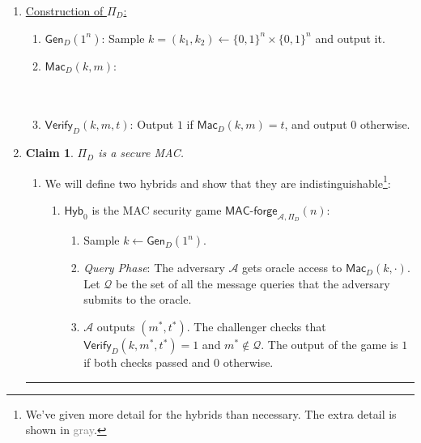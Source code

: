 \documentclass[11pt]{article}
\newcommand\custombox[2]{%
    \fbox{\rule{#1}{0pt}\rule[-0.5ex]{0pt}{#2}}}
\newcommand{\qed}{\hspace*{\fill}\rule{7pt}{7pt}}
\newtheorem{claim}[theorem]{Claim}
\numberwithin{equation}{section}
\newenvironment{proof}{\noindent{\bf Proof}\hspace*{1em}}{\qed\medskip}
\newcommand{\Gen}{\mathsf{Gen}}
\newcommand{\A}{\mathcal{A}}
\newcommand{\hyb}{\mathsf{Hyb}}
\newcommand{\bin}{\{0,1\}}
\newcommand{\bit}{\bin}
\newcommand{\gen}{\mathsf{Gen}}
\newcommand{\mac}{\mathsf{Mac}}
\newcommand{\verify}{\mathsf{Verify}}
\begin{document}
\begin{enumerate}
\item \noindent\underline{Construction of $\Pi_D$:}
\begin{enumerate}
    \item $\Gen_D(1^n)$: Sample $k = (k_1, k_2) \leftarrow \bit^n \times \bit^n$ and output it.
    \item $\mac_D(k,m)$:
    \\\\ 
    \custombox{5in}{.5in}\\
    \item $\verify_D(k,m,t)$: Output $1$ if $\mac_D(k,m) = t$, and output $0$ otherwise.
\end{enumerate}

\item 
\begin{claim}
    $\Pi_D$ is a secure MAC.
\end{claim}
\begin{proof}
\begin{enumerate}
    \item We will define two hybrids and show that they are indistinguishable\footnote{We've given more detail for the hybrids than necessary. The extra detail is shown in \textcolor{gray}{gray}.}:
    \begin{enumerate}
        \item $\hyb_0$ is the MAC security game $\mathsf{MAC\text{-}forge}_{\A, \Pi_D}(n)$:
        {\color{gray}\begin{enumerate}
            \item Sample $k \leftarrow \gen_D(1^n)$.
            \item \textit{Query Phase}: The adversary $\A$ gets oracle access to $\mac_D(k, \cdot)$. Let $\mathcal{Q}$ be the set of all the message queries that the adversary submits to the oracle.
            \item $\A$ outputs $(m^*, t^*)$. The challenger checks that $\verify_D(k, m^*, t^*) = 1$ and $m^* \notin \mathcal{Q}$. The output of the game is $1$ if both checks passed and $0$ otherwise.
        \end{enumerate}
        }
        

\end{enumerate}
\end{enumerate}
\end{proof}
\end{enumerate}
\end{document}
